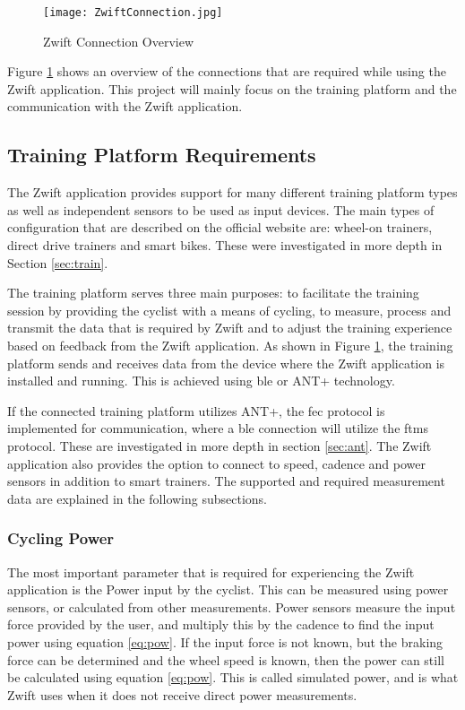 \begin{figure}[H]
	\begin{center}
		\texttt{[image: ZwiftConnection.jpg]}
		\caption{Zwift Connection Overview}
		\label{fig:zwift}
	\end{center}
\end{figure}

Figure \ref{fig:zwift} shows an overview of the connections that are required while using the Zwift application. This project will mainly focus on the training platform and the communication with the Zwift application.

\subsection{Training Platform Requirements}
The Zwift application provides support for many different training platform types as well as independent sensors to be used as input devices. The main types of configuration that are described on the official website are: wheel-on trainers, direct drive trainers and smart bikes. These were investigated in more depth in Section \ref{sec:train}.

The training platform serves three main purposes: to facilitate the training session by providing the cyclist with a means of cycling, to measure, process and transmit the data that is required by Zwift and to adjust the training experience based on feedback from the Zwift application. As shown in Figure \ref{fig:zwift}, the training platform sends and receives data from the device where the Zwift application is installed and running. This is achieved using \ac{ble} or ANT+ technology.

If the connected training platform utilizes ANT+, the \ac{fec} protocol is implemented for communication, where a \ac{ble} connection will utilize the \ac{ftms} protocol. These are investigated in more depth in section \ref{sec:ant}. The Zwift application also provides the option to connect to speed, cadence and power sensors in addition to smart trainers. The supported and required measurement data are explained in the following subsections.

\subsubsection{Cycling Power}
The most important parameter that is required for experiencing the Zwift application is the Power input by the cyclist. This can be measured using power sensors, or calculated from other measurements. Power sensors measure the input force provided by the user, and multiply this by the cadence to find the input power using equation \ref{eq:pow}. If the input force is not known, but the braking force can be determined and the wheel speed is known, then the power can still be calculated using equation \ref{eq:pow}. This is called simulated power, and is what Zwift uses when it does not receive direct power measurements.

